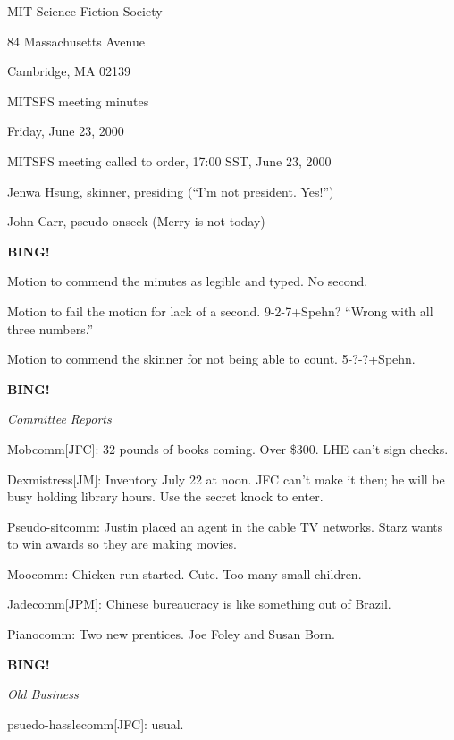 \documentclass[12pt]{article}
\newcommand{\bing}{{\bf BING!} }
\newcommand{\goto}[1]{\bing \vskip 12pt \centerline{{\em{#1}}}}
\begin{document}
\begin{center}

MIT Science Fiction Society 

84 Massachusetts Avenue

Cambridge, MA 02139

\vspace{12pt}

MITSFS meeting minutes

Friday, June 23, 2000

\end{center}

\vskip 12pt

MITSFS meeting called to order, 17:00 SST, June 23, 2000

Jenwa Hsung, skinner, presiding (``I'm not president.  Yes!'')

John Carr, pseudo-onseck (Merry is not today)

{\bf BING!}

\vskip 12pt

Motion to commend the minutes as legible and typed.  No second.

Motion to fail the motion for lack of a second.  \hbox{9-2-7+Spehn}?
``Wrong with all three numbers.''

Motion to commend the skinner for not being able to count.  \hbox{5-?-?+Spehn}.

\vskip 12pt

\goto{Committee Reports}

\vskip 12pt

Mobcomm[JFC]: 32 pounds of books coming.  Over \$300.  LHE can't sign checks.

Dexmistress[JM]: Inventory July 22 at noon.  JFC can't make it then;
he will be busy holding library hours.  Use the secret knock to enter.

Pseudo-sitcomm: Justin placed an agent in the cable TV networks.
Starz wants to win awards so they are making movies.

Moocomm: Chicken run started.  Cute.  Too many small children.

Jadecomm[JPM]: Chinese bureaucracy is like something out of Brazil.

Pianocomm: Two new prentices.  Joe Foley and Susan Born.

\vskip 12pt

\goto{Old Business}

\vskip 12pt

psuedo-hasslecomm[JFC]: usual.
\end{document}
